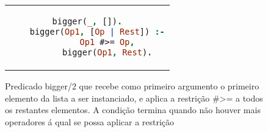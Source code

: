 \begin{figure}
    \centering
    \begin{tabular}{c}
    \begin{lstlisting}[language=Prolog]
    bigger(_, []).
    bigger(Op1, [Op | Rest]) :-
        Op1 #>= Op,
        bigger(Op1, Rest).
    \end{lstlisting}
    \end{tabular}
    \caption{Predicado bigger/2 que recebe como primeiro argumento o primeiro elemento da lista a ser instanciado, e aplica a restrição \#>= a todos os restantes elementos. A condição termina quando não houver mais operadores á qual se possa aplicar a restrição}
    \label{code:bigger}
\end{figure}